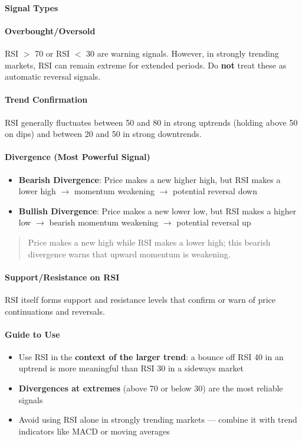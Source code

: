 \documentclass[12pt,openany]{book}
\begin{document}
\paragraph{Signal Types}

\paragraph{Overbought/Oversold}
RSI \(>\) 70 or RSI \(<\) 30 are warning signals. However, in strongly trending markets, RSI can remain extreme for extended periods. Do \textbf{not} treat these as automatic reversal signals.

\paragraph{Trend Confirmation}
RSI generally fluctuates between 50 and 80 in strong uptrends (holding above 50 on dips) and between 20 and 50 in strong downtrends.

\paragraph{Divergence (Most Powerful Signal)}
\begin{itemize}[leftmargin=*]
    \item \textbf{Bearish Divergence}: Price makes a new higher high, but RSI makes a lower high \(\rightarrow\) momentum weakening \(\rightarrow\) potential reversal down
    \item \textbf{Bullish Divergence}: Price makes a new lower low, but RSI makes a higher low \(\rightarrow\) bearish momentum weakening \(\rightarrow\) potential reversal up
\end{itemize}

\begin{quote}
Price makes a new high while RSI makes a lower high; this bearish divergence warns that upward momentum is weakening.
\end{quote}

\paragraph{Support/Resistance on RSI}
RSI itself forms support and resistance levels that confirm or warn of price continuations and reversals.

\paragraph{Guide to Use}
\begin{itemize}[leftmargin=*]
    \item Use RSI in the \textbf{context of the larger trend}: a bounce off RSI 40 in an uptrend is more meaningful than RSI 30 in a sideways market
    \item \textbf{Divergences at extremes} (above 70 or below 30) are the most reliable signals
    \item Avoid using RSI alone in strongly trending markets --- combine it with trend indicators like MACD or moving averages
\end{itemize}
\end{document}
